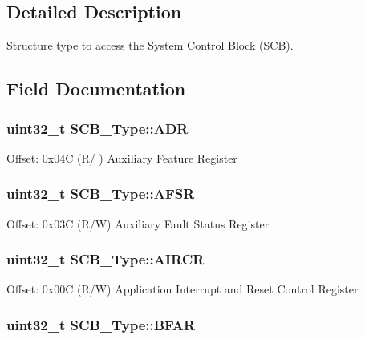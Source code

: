 \subsection{Detailed Description}
Structure type to access the System Control Block (S\-C\-B). 

\subsection{Field Documentation}
\hypertarget{structSCB__Type_aaedf846e435ed05c68784b40d3db2bf2}{
\subsubsection[{A\-D\-R}]{ uint32\-\_\-t S\-C\-B\-\_\-\-Type\-::\-A\-D\-R}}\label{structSCB__Type_aaedf846e435ed05c68784b40d3db2bf2}
Offset\-: 0x04\-C (R/ ) Auxiliary Feature Register \hypertarget{structSCB__Type_aeb77053c84f49c261ab5b8374e8958ef}{
\subsubsection[{A\-F\-S\-R}]{ uint32\-\_\-t S\-C\-B\-\_\-\-Type\-::\-A\-F\-S\-R}}\label{structSCB__Type_aeb77053c84f49c261ab5b8374e8958ef}
Offset\-: 0x03\-C (R/\-W) Auxiliary Fault Status Register \hypertarget{structSCB__Type_a6ed3c9064013343ea9fd0a73a734f29d}{
\subsubsection[{A\-I\-R\-C\-R}]{ uint32\-\_\-t S\-C\-B\-\_\-\-Type\-::\-A\-I\-R\-C\-R}}\label{structSCB__Type_a6ed3c9064013343ea9fd0a73a734f29d}
Offset\-: 0x00\-C (R/\-W) Application Interrupt and Reset Control Register \hypertarget{structSCB__Type_a31f79afe86c949c9862e7d5fce077c3a}{
\subsubsection[{B\-F\-A\-R}]{ uint32\-\_\-t S\-C\-B\-\_\-\-Type\-::\-B\-F\-A\-R}}\label{structSCB__Type_a31f79afe86c949c9862e7d5fce077c3a}
